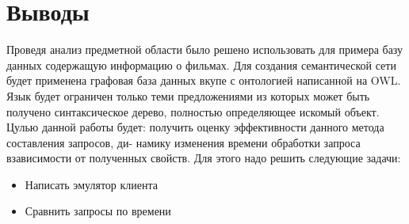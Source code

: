 \section{Выводы}
Проведя анализ предметной области было решено использовать для примера базу данных содержащую информацию о фильмах. Для создания семантической сети будет применена графовая база данных вкупе с онтологией написанной на OWL. Язык будет ограничен только теми предложениями из которых может быть получено синтаксическое дерево, полностью определяющее искомый объект.
Цулью данной работы будет:
получить оценку эффективности данного метода составления запросов, ди-
намику изменения времени обработки запроса взависимости от полученных
свойств.
Для этого надо решить следующие задачи:
\begin{itemize}
\item Написать эмулятор клиента
\item Сравнить запросы по времени
\end{itemize}


